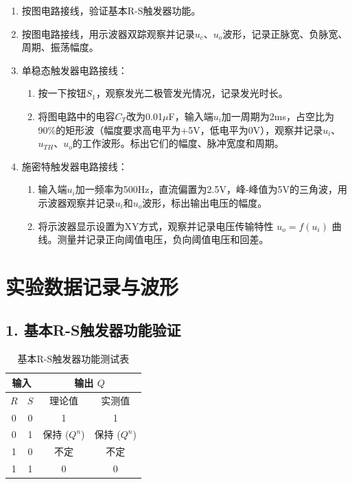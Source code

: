 \documentclass[10.5pt]{config}
\begin{document}
\begin{enumerate}[label=\arabic*., leftmargin=2em]
    \item 按图电路接线，验证基本R-S触发器功能。
    \item 按图电路接线，用示波器双踪观察并记录$u_c$、$u_o$波形，记录正脉宽、负脉宽、周期、振荡幅度。
    \item 单稳态触发器电路接线：
    \begin{enumerate}
        \item 按一下按钮$S_1$，观察发光二极管发光情况，记录发光时长。
        \item 将图电路中的电容$C_T$改为0.01$\mu$F，输入端$u_i$加一周期为2ms，占空比为90\%的矩形波（幅度要求高电平为+5V，低电平为0V），观察并记录$u_i$、$u_{TH}$、$u_o$的工作波形。标出它们的幅度、脉冲宽度和周期。
    \end{enumerate}
    \item 施密特触发器电路接线：
    \begin{enumerate}
        \item 输入端$u_i$加一频率为500Hz，直流偏置为2.5V，峰-峰值为5V的三角波，用示波器观察并记录$u_i$和$u_o$波形，标出输出电压的幅度。
        \item 将示波器显示设置为XY方式，观察并记录电压传输特性 $u_o = f(u_i)$ 曲线。测量并记录正向阈值电压，负向阈值电压和回差。
    \end{enumerate}
\end{enumerate}

\section{实验数据记录与波形}

\subsection*{1. 基本R-S触发器功能验证}
\begin{table}[H]
    \centering
    \caption{基本R-S触发器功能测试表}
    \begin{tabular}{|c|c|c|c|}
        \hline
        \multicolumn{2}{|c|}{输入} & \multicolumn{2}{c|}{输出 $Q$} \\ \hline
        $R$ & $S$ & 理论值 & 实测值 \\ \hline
        0 & 0 & 1 & 1 \\ \hline
        0 & 1 & 保持 ($Q^n$) & 保持 ($Q^n$) \\ \hline
        1 & 0 & 不定 & 不定 \\ \hline
        1 & 1 & 0 & 0 \\ \hline
    \end{tabular}
\end{table}
\end{document}
